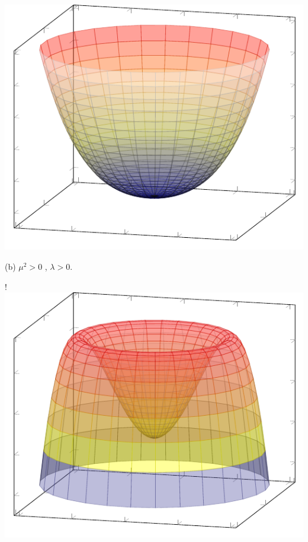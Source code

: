 {{\includegraphics[scale=1]{SM/pp.pdf}
}
\begin{center}\normalfont\small {(b) $\mu^{2}>0$ , $\lambda>0$.}\end{center}
\resizebox {\marginparwidth} {!} 
{
\includegraphics[scale=1]{SM/pm.pdf}
}}
